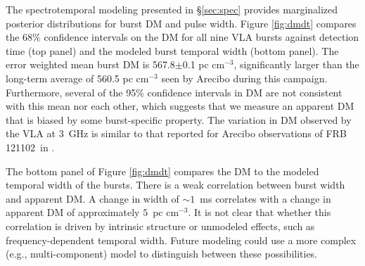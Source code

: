 \documentclass[twocolumn]{aastex61}
\newcommand{\frb}{FRB 121102}
\begin{document}
The spectrotemporal modeling presented in \S \ref{sec:spec} provides marginalized posterior distributions for burst DM and pulse width. Figure \ref{fig:dmdt} compares the 68\% confidence intervals on the DM for all nine VLA bursts against detection time (top panel) and the modeled burst temporal width (bottom panel). The error weighted mean burst DM is 567.8$\pm$0.1 pc cm$^{-3}$, significantly larger than the long-term average of 560.5 pc cm$^{-3}$ seen by Arecibo during this campaign. Furthermore, several of the 95\% confidence intervals in DM are not consistent with this mean nor each other, which suggests that we measure an apparent DM that is biased by some burst-specific property. The variation in DM observed by the VLA at 3~GHz is similar to that reported for Arecibo observations of \frb\ in \citet{2016Natur.531..202S, 2016arXiv160308880S}.

The bottom panel of Figure \ref{fig:dmdt} compares the DM to the modeled temporal width of the bursts. There is a weak correlation between burst width and apparent DM. A change in width of $\sim1$~ms correlates with a change in apparent DM of approximately $5$~pc cm$^{-3}$. It is not clear that whether this correlation is driven by intrinsic structure or unmodeled effects, such as frequency-dependent temporal width. Future modeling could use a more complex (e.g., multi-component) model to distinguish between these possibilities.
\end{document}
